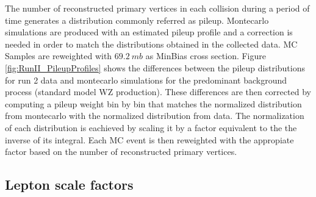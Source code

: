The number of reconstructed primary vertices in each collision during a period
of time generates a distribution commonly referred as pileup. Montecarlo simulations
are produced with an estimated pileup profile and a correction is needed
in order to match the distributions obtained in the collected data. 
MC Samples are reweighted with $69.2~mb$ as MinBias cross section.
Figure \ref{fig:RunII_PileupProfiles} shows the differences between the
pileup distributions for run 2 data and montecarlo
simulations for the predominant background process (standard model
WZ production). These differences are then
corrected by computing a pileup weight bin by bin that matches the normalized
distribution from montecarlo with the normalized distribution from data.
The normalization of each distribution is eachieved by scaling it by a factor
equivalent to the the inverse of its integral. Each MC event is then reweighted
with the appropiate factor based on the number of reconstructed primary vertices. 

\subsection{Lepton scale factors}

